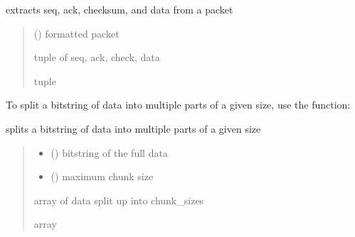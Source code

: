 \documentclass[letterpaper,10pt,english,openany,oneside]{sphinxmanual}
\begin{document}
\begin{fulllineitems}
\label{\detokenize{index:rdt_protocol.parse_packet}}
\pysigstartsignatures
\pysiglinewithargsret
{}
{}
{}
\pysigstopsignatures
\sphinxAtStartPar
extracts seq, ack, checksum, and data from a packet
\begin{quote}\begin{description}
\sphinxAtStartPar
{} () \textendash{} formatted packet

 tuple of seq, ack, check, data

\sphinxAtStartPar
tuple

\end{description}\end{quote}

\end{fulllineitems}


\sphinxAtStartPar
To split a bitstring of data into multiple parts of a given size, use the  function:

\begin{fulllineitems}
\label{\detokenize{index:rdt_protocol.split_data}}
\pysigstartsignatures
\pysiglinewithargsret
{}
{\sphinxparamcomma {}}
{}
\pysigstopsignatures
\sphinxAtStartPar
splits a bitstring of data into multiple parts of a given size
\begin{quote}\begin{description}
\begin{itemize}
\item {} 
\sphinxAtStartPar
{} () \textendash{} bitstring of the full data

\item {} 
\sphinxAtStartPar
{} () \textendash{} maximum chunk size

\end{itemize}

\sphinxAtStartPar
array of data split up into chunk\_sizes

\sphinxAtStartPar
array

\end{description}\end{quote}

\end{fulllineitems}
\end{document}
